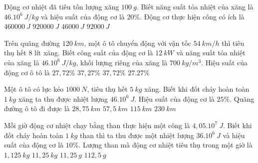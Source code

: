 \begin{ex} 
	Động cơ nhiệt đã tiêu tốn lượng xăng $100 \ g$. Biết năng suất tỏa nhiệt của xăng là $46 . 10^{6} \ J / kg$ và hiệu suất của động cơ là $20 \%$. Động cơ thực hiện công có ích là
	\choice
	{$460000 \ J$}
	{\True $920000 \ J$}
	{$46000 \ J$}
	{$92000 \ J$}
	\loigiai{
	}
\end{ex}

\begin{ex} 
	Trên quãng đường $120 \ km$, một ô tô chuyển động với vận tốc $54 \ km / h$ thì tiêu thụ hết 8 lít xăng. Biết công suất của động cơ là $12 \ kW$ và năng suất tỏa nhiệt của xăng là $46.10^{6} \ J / kg$, khối lượng riêng của xăng là $700 \ kg / m^3$. Hiệu suất của động cơ ô tô là 
	\choice
	{$27,72 \%$}
	{\True $37,27 \%$}
	{$37,72 \%$}
	{$27.27 \%$}
	\loigiai{
	}
\end{ex}
\begin{ex} 
	Một ô tô có lực kéo $1000 \ N$, tiêu thụ hết $5 \ kg$ xăng. Biết khi đốt cháy hoàn toàn $1 \ kg$ xăng ta thu được nhiệt lượng $46 . 10^{6} \ J$. Hiệu suất của động cơ là $25 \%$. Quãng đường ô tô đi được là
	\choice
	{$28,75 \ km$}
	{\True $57,5 \ km$}
	{$115 \ km$}
	{$230 \ km$}
	\loigiai{
	}
\end{ex}
\begin{ex} 
	Mỗi giờ động cơ nhiệt chạy bằng than thực hiện một công là $4,05.10^7 \ J$. Biết khi đốt cháy hoàn toàn $1 \ kg$ than thì ta thu được một nhiệt lượng $36.10^{6} \ J$ và hiệu suất của động cơ là $10 \%$. Lượng than mà động cơ nhiệt tiêu thụ trong một giờ là
	\choice
	{$1,125 \ kg$}
	{\True $11,25 \ kg$}
	{$11,25 \ g$}
	{$112,5 \ g$}
	\loigiai{
	}
\end{ex}